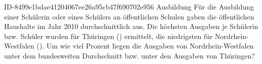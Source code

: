 \begin{exercise}
      {ID-8499e1bdae41204067ee26a95cb47f690702e956}
      {Ausbildung}
  \ifproblem\problem
    Für die Ausbildung einer Schülerin oder eines Schülers an öffentlichen Schulen
    gaben die öffentlichen Haushalte im Jahr 2010 durchschnittlich  aus.
    Die höchsten Ausgaben je Schülerin bzw. Schüler wurden für Thüringen ()
    ermittelt, die niedrigsten für Nordrhein-Westfalen ().
    Um wie viel Prozent liegen die Ausgaben von Nordrhein-Westfalen unter dem
    bundesweiten Durchschnitt bzw. unter den Ausgaben von Thüringen?
  \fi
\end{exercise}
